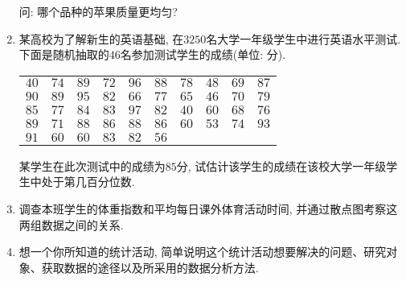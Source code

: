 \documentclass[10pt,a4paper]{article}
\begin{document}
\begin{enumerate}[1.]
\begin{center}
\begin{tabular}{|c|c|c|c|c|c|c|c|c|c|c|}
\end{tabular}
\end{center}
问: 哪个品种的苹果质量更均匀? 
\item 某高校为了解新生的英语基础, 在$3250$名大学一年级学生中进行英语水平测试. 下面是随机抽取的$46$名参加测试学生的成绩(单位: 分).
\begin{center}
\begin{tabular}{cccccccccc}
$40$ & $74$ & $89$ & $72$ & $96$ & $88$ & $78$ & $48$ & $69$ & $87$\\
$90$ & $89$ & $95$ & $82$ & $66$ & $77$ & $65$ & $46$ & $70$ & $79$\\
$85$ & $77$ & $84$ & $83$ & $97$ & $82$ & $40$ & $60$ & $68$ & $76$\\
$89$ & $71$ & $88$ & $86$ & $88$ & $86$ & $60$ & $53$ & $74$ & $93$\\
$91$ & $60$ & $60$ & $83$ & $82$ & $56$ &&&&
\end{tabular}
\end{center}
某学生在此次测试中的成绩为$85$分, 试估计该学生的成绩在该校大学一年级学生中处于第几百分位数.
\item 调查本班学生的体重指数和平均每日课外体育活动时间, 并通过散点图考察这两组数据之间的关系.
\item 想一个你所知道的统计活动, 简单说明这个统计活动想要解决的问题、研究对象、获取数据的途径以及所采用的数据分析方法. 
\end{enumerate}
\end{document}
